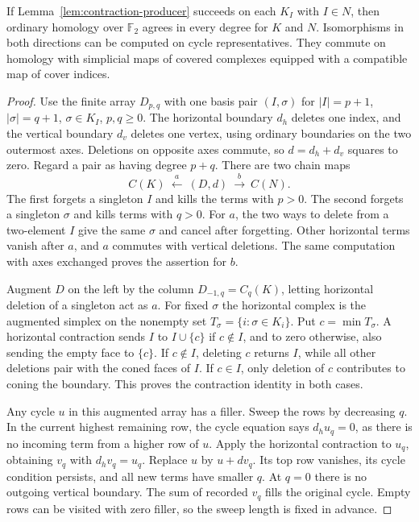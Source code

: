 \begin{theorem}\label{thm:nerve-homology}
If Lemma~\ref{lem:contraction-producer} succeeds on each $K_I$ with
$I\in N$, then ordinary homology over $\mathbb F_2$ agrees in every degree
for $K$ and $N$. Isomorphisms in both directions can be computed on cycle
representatives. They commute on homology with simplicial maps of covered
complexes equipped with a compatible map of cover indices.
\end{theorem}
\begin{proof}
Use the finite array $D_{p,q}$ with one basis pair $(I,\sigma)$ for
$|I|=p+1$, $|\sigma|=q+1$, $\sigma\in K_I$, $p,q\ge0$.
The horizontal boundary $d_h$ deletes one index, and the vertical boundary
$d_v$ deletes one vertex, using ordinary boundaries on the two outermost
axes. Deletions on opposite axes commute, so
$d=d_h+d_v$ squares to zero. Regard a pair as having degree $p+q$.
There are two chain maps
\[
 C(K)\ \xleftarrow{\ a\ }\ (D,d)\ \xrightarrow{\ b\ }\ C(N).
\]
The first forgets a singleton $I$ and kills the terms with $p>0$. The
second forgets a singleton $\sigma$ and kills terms with $q>0$.
For $a$, the two ways to delete from a two-element $I$ give the same
$\sigma$ and cancel after forgetting. Other horizontal terms vanish after
$a$, and $a$ commutes with vertical deletions. The same computation with
axes exchanged proves the assertion for $b$.

Augment $D$ on the left by the column $D_{-1,q}=C_q(K)$, letting
horizontal deletion of a singleton act as $a$. For fixed $\sigma$ the
horizontal complex is the augmented simplex on the nonempty set
$T_\sigma=\{i:\sigma\in K_i\}$. Put $c=\min T_\sigma$. A horizontal
contraction sends $I$ to $I\cup\{c\}$ if $c\notin I$, and to zero
otherwise, also sending the empty face to $\{c\}$. If $c\notin I$,
deleting $c$ returns $I$, while all other deletions pair with the coned
faces of $I$. If $c\in I$, only deletion of $c$ contributes to coning
the boundary. This proves the contraction identity in both cases.

Any cycle $u$ in this augmented array has a filler. Sweep the rows by
decreasing $q$. In the current highest remaining row, the cycle equation
says $d_h u_q=0$, as there is no incoming term from a higher row of $u$.
Apply the horizontal contraction to $u_q$, obtaining $v_q$ with
$d_hv_q=u_q$. Replace $u$ by $u+d v_q$. Its top row vanishes, its
cycle condition persists, and all new terms have smaller $q$. At $q=0$
there is no outgoing vertical boundary. The sum of recorded $v_q$ fills
the original cycle. Empty rows can be visited with zero filler, so the
sweep length is fixed in advance.


\end{proof}
